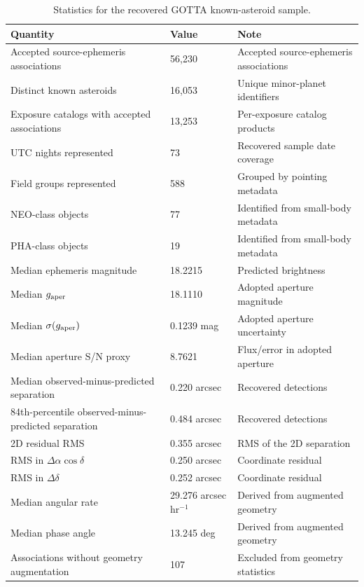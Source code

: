 \begin{table}
\centering
\caption{Statistics for the recovered GOTTA known-asteroid sample.}
\label{tab:summary}
\footnotesize
\setlength{\tabcolsep}{6pt}
\renewcommand{\arraystretch}{1.12}
\begin{tabular}{p{}p{}p{}}
\toprule
Quantity & Value & Note \\
\midrule
Accepted source-ephemeris associations & 56,230 & Accepted source-ephemeris associations \\
Distinct known asteroids & 16,053 & Unique minor-planet identifiers \\
Exposure catalogs with accepted associations & 13,253 & Per-exposure catalog products \\
UTC nights represented & 73 & Recovered sample date coverage \\
Field groups represented & 588 & Grouped by pointing metadata \\
NEO-class objects & 77 & Identified from small-body metadata \\
PHA-class objects & 19 & Identified from small-body metadata \\
Median ephemeris magnitude & 18.2215 & Predicted brightness \\
Median $g_{\rm aper}$ & 18.1110 & Adopted aperture magnitude \\
Median $\sigma(g_{\rm aper})$ & 0.1239 mag & Adopted aperture uncertainty \\
Median aperture S/N proxy & 8.7621 & Flux/error in adopted aperture \\
Median observed-minus-predicted separation & 0.220 arcsec & Recovered detections \\
84th-percentile observed-minus-predicted separation & 0.484 arcsec & Recovered detections \\
2D residual RMS & 0.355 arcsec & RMS of the 2D separation \\
RMS in $\Delta\alpha\cos\delta$ & 0.250 arcsec & Coordinate residual \\
RMS in $\Delta\delta$ & 0.252 arcsec & Coordinate residual \\
Median angular rate & 29.276 arcsec hr$^{-1}$ & Derived from augmented geometry \\
Median phase angle & 13.245 deg & Derived from augmented geometry \\
Associations without geometry augmentation & 107 & Excluded from geometry statistics \\
\bottomrule
\end{tabular}
\end{table}
